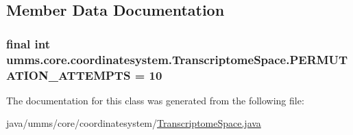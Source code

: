 \subsection{Member Data Documentation}
\hypertarget{classumms_1_1core_1_1coordinatesystem_1_1_transcriptome_space_ac633a7629ab88d7c52e954b28b5d707a}{
\subsubsection[{P\+E\+R\+M\+U\+T\+A\+T\+I\+O\+N\+\_\+\+A\+T\+T\+E\+M\+P\+T\+S}]{\setlength{\rightskip}{0pt plus 5cm}final int umms.\+core.\+coordinatesystem.\+Transcriptome\+Space.\+P\+E\+R\+M\+U\+T\+A\+T\+I\+O\+N\+\_\+\+A\+T\+T\+E\+M\+P\+T\+S = 10\hspace{0.3cm}{\ttfamily [static]}}}\label{classumms_1_1core_1_1coordinatesystem_1_1_transcriptome_space_ac633a7629ab88d7c52e954b28b5d707a}


The documentation for this class was generated from the following file\+:\begin{DoxyCompactItemize}
\item 
java/umms/core/coordinatesystem/\hyperlink{_transcriptome_space_8java}{Transcriptome\+Space.\+java}\end{DoxyCompactItemize}
